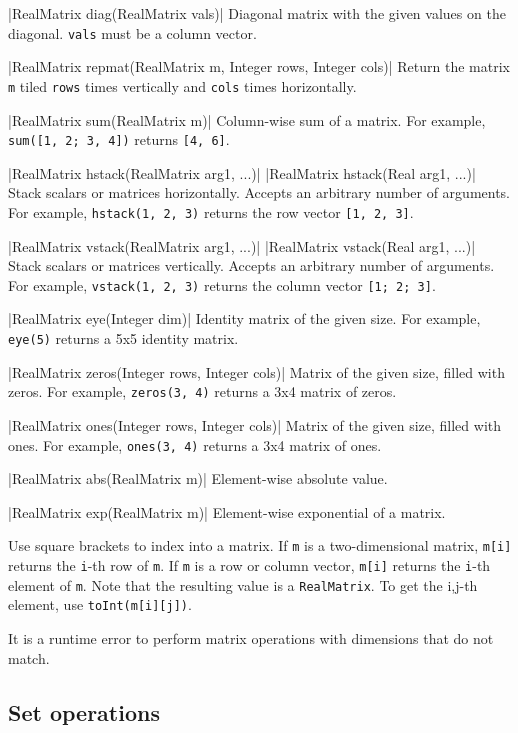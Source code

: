 \blog|RealMatrix diag(RealMatrix vals)|
\myindent Diagonal matrix with the given values on the diagonal. \verb|vals|
must be a column vector.

\blog|RealMatrix repmat(RealMatrix m, Integer rows, Integer cols)|
\myindent Return the matrix \verb|m| tiled \verb|rows| times vertically and
\verb|cols|
times horizontally.

\blog|RealMatrix sum(RealMatrix m)|
\myindent Column-wise sum of a matrix.
For example, \verb|sum([1, 2; 3, 4])| returns \verb|[4, 6]|.

\blog|RealMatrix hstack(RealMatrix arg1, ...)|
\blog|RealMatrix hstack(Real arg1, ...)|
\myindent Stack scalars or matrices horizontally. Accepts an arbitrary number
of
arguments.
For example, \verb|hstack(1, 2, 3)| returns the row vector {\tt [1, 2, 3]}.

\blog|RealMatrix vstack(RealMatrix arg1, ...)|
\blog|RealMatrix vstack(Real arg1, ...)|
\myindent Stack scalars or matrices vertically. Accepts an arbitrary number of
arguments.
For example, \verb|vstack(1, 2, 3)| returns the column vector {\tt [1; 2; 3]}.

\blog|RealMatrix eye(Integer dim)|
\myindent Identity matrix of the given size.
For example, \verb|eye(5)| returns a 5x5 identity matrix.

\blog|RealMatrix zeros(Integer rows, Integer cols)|
\myindent Matrix of the given size, filled with zeros.
For example, \verb|zeros(3, 4)| returns a 3x4 matrix of zeros.

\blog|RealMatrix ones(Integer rows, Integer cols)|
\myindent Matrix of the given size, filled with ones.
For example, \verb|ones(3, 4)| returns a 3x4 matrix of ones.

\blog|RealMatrix abs(RealMatrix m)|
\myindent Element-wise absolute value.

\blog|RealMatrix exp(RealMatrix m)|
\myindent Element-wise exponential of a matrix.

Use square brackets to index into a matrix. If \verb|m| is a two-dimensional
matrix, \verb|m[i]| returns the \verb|i|-th row of \verb|m|. If \verb|m| is a
row or column vector, \verb|m[i]| returns the \verb|i|-th element of \verb|m|.
Note that the resulting value is a \verb|RealMatrix|. To get the i,j-th
element, use \verb|toInt(m[i][j])|.

It is a runtime error to perform matrix operations with dimensions that do not
match.


\subsection{Set operations}
\label{sec:builtin-set-ops}

